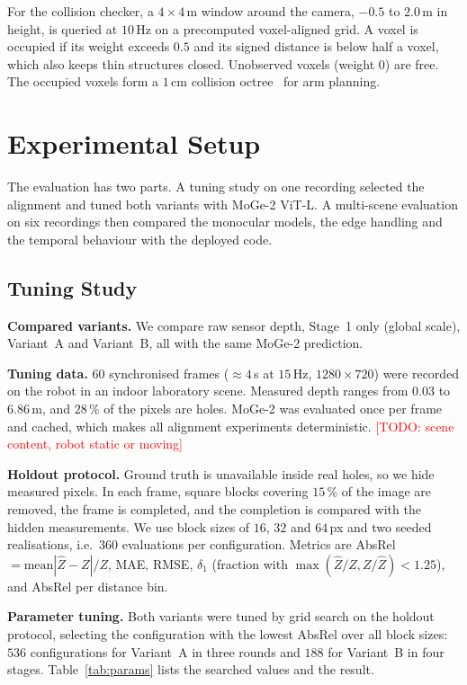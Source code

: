 \documentclass[conference]{IEEEtran}
\newcommand{\todo}[1]{\textcolor{red}{[TODO: #1]}}
\newcommand{\Dm}{Z}            %
\begin{document}
For the collision checker, a \(4{\times}4\,\)m window around the camera,
\(-0.5\) to \(2.0\,\)m in height, is queried at \(10\,\)Hz on a precomputed
voxel-aligned grid. A voxel is occupied if its weight exceeds \(0.5\) and its
signed distance is below half a voxel, which also keeps thin structures
closed. Unobserved voxels (weight \(0\)) are free. The occupied voxels form a
\(1\,\)cm collision octree~\cite{pan2012fcl} for arm planning.

\section{Experimental Setup}
\label{sec:setup}

The evaluation has two parts. A tuning study on one recording selected the
alignment and tuned both variants with MoGe-2 ViT-L. A multi-scene evaluation
on six recordings then compared the monocular models, the edge handling and the
temporal behaviour with the deployed code.

\subsection{Tuning Study}

\textbf{Compared variants.} We compare raw sensor depth, Stage~1 only
(global scale), Variant~A and Variant~B, all with the same MoGe-2 prediction.

\textbf{Tuning data.} \(60\) synchronised frames (\(\approx\!4\,\)s at
\(15\,\)Hz, \(1280{\times}720\)) were recorded on the robot in an indoor
laboratory scene. Measured depth ranges from \(0.03\) to \(6.86\,\)m, and
\(28\,\%\) of the pixels are holes. MoGe-2 was evaluated once per frame and
cached, which makes all alignment experiments deterministic. \todo{scene
content, robot static or moving}

\textbf{Holdout protocol.} Ground truth is unavailable inside real holes, so we
hide measured pixels. In each frame, square blocks covering \(15\,\%\) of the
image are removed, the frame is completed, and the completion is compared with
the hidden measurements. We use block sizes of \(16\), \(32\) and \(64\,\)px
and two seeded realisations, i.e.\ \(360\) evaluations per configuration.
Metrics are AbsRel \(=\mathrm{mean}|\hat \Dm-\Dm|/\Dm\), MAE, RMSE,
\(\delta_1\) (fraction with \(\max(\hat \Dm/\Dm,\Dm/\hat \Dm)<1.25\)), and
AbsRel per distance bin.

\textbf{Parameter tuning.} Both variants were tuned by grid search on the
holdout protocol, selecting the configuration with the lowest AbsRel over all
block sizes: \(536\) configurations for Variant~A in three rounds and \(188\)
for Variant~B in four stages. Table~\ref{tab:params} lists the searched values
and the result.
\end{document}

